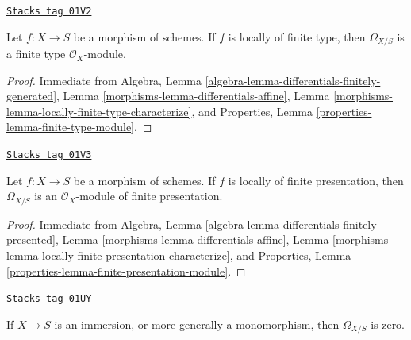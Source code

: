 \begin{lemma}
\label{morphisms-lemma-finite-type-differentials}
\href{https://stacks.math.columbia.edu/tag/01V2}{\texttt{Stacks tag 01V2}}

Let $f : X \to S$ be a morphism of schemes.
If $f$ is locally of finite type, then $\Omega_{X/S}$ is
a finite type $\mathcal{O}_X$-module.
\end{lemma}

\begin{proof}

Immediate from
Algebra, Lemma \ref{algebra-lemma-differentials-finitely-generated},
Lemma \ref{morphisms-lemma-differentials-affine},
Lemma \ref{morphisms-lemma-locally-finite-type-characterize}, and
Properties, Lemma \ref{properties-lemma-finite-type-module}.
\end{proof}

\begin{lemma}
\label{morphisms-lemma-finite-presentation-differentials}
\href{https://stacks.math.columbia.edu/tag/01V3}{\texttt{Stacks tag 01V3}}

Let $f : X \to S$ be a morphism of schemes.
If $f$ is locally of finite presentation, then $\Omega_{X/S}$ is
an $\mathcal{O}_X$-module of finite presentation.
\end{lemma}

\begin{proof}

Immediate from
Algebra, Lemma \ref{algebra-lemma-differentials-finitely-presented},
Lemma \ref{morphisms-lemma-differentials-affine},
Lemma \ref{morphisms-lemma-locally-finite-presentation-characterize}, and
Properties, Lemma \ref{properties-lemma-finite-presentation-module}.
\end{proof}

\begin{lemma}
\label{morphisms-lemma-immersion-differentials}
\href{https://stacks.math.columbia.edu/tag/01UY}{\texttt{Stacks tag 01UY}}

If $X \to S$ is an immersion, or more generally a monomorphism, then
$\Omega_{X/S}$ is zero.
\end{lemma}

